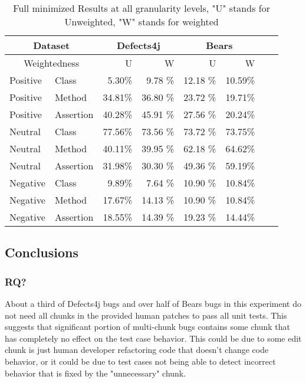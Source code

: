 \documentclass[sigconf, timestamp-false, anonymous=true]{acmart}
\begin{document}
\begin{table}
{\begin{center}
\begin{tabular}{| l | l | r | r | r | r | r | r |}
\hline
\multicolumn{2}{|c|}{Dataset} &\multicolumn{2}{|c|}{Defects4j} & \multicolumn{2}{|c|}{Bears} \\
\hline
\multicolumn{2}{|c|}{Weightedness} & U & W & U & W  \\
\hline
Positive & Class & 5.30\% & 9.78 \% & 12.18 \% & 10.59\%  \\
Positive & Method & 34.81\% & 36.80 \% & 23.72 \% & 19.71\%  \\
Positive & Assertion & 40.28\% & 45.91 \% & 27.56 \% & 20.24\%  \\ 
\hline
Neutral & Class & 77.56\% & 73.56 \% & 73.72 \% & 73.75\% \\
Neutral & Method & 40.11\% & 39.95 \% & 62.18 \% & 64.62\%  \\
Neutral & Assertion & 31.98\% & 30.30 \% & 49.36 \% &  59.19\%  \\ 
\hline
Negative & Class & 9.89\% & 7.64 \% & 10.90 \% & 10.84\%  \\
Negative & Method & 17.67\% & 14.13 \% & 10.90 \% & 10.84\%  \\
Negative & Assertion & 18.55\% & 14.39 \% & 19.23 \% &  14.44\%  \\ 
\hline
\end{tabular}
\end{center}}
\caption{Full minimized Results at all granularity levels, "U" stands for Unweighted, "W" stands for weighted}
\end{table}

    
\subsection{Conclusions}

\subsubsection{RQ?}
About a third of Defects4j bugs and over half of
Bears bugs in this experiment do not need all chunks in the provided human patches to pass
all unit tests. This suggests that significant portion of multi-chunk bugs contains some
chunk that has completely no effect on the test case behavior. This could be due to some
edit chunk is just human developer refactoring code that doesn't change code behavior,
or it could be due to test cases not being able to detect incorrect behavior that is fixed
by the "unnecessary" chunk.
\end{document}
